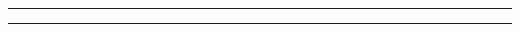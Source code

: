 \documentclass[a4paper,10pt]{report}
\begin{document}
\begin{multicols*}{3}


\vfill

\hrule\vspace{2mm}
\vspace{2mm}\hrule


\end{multicols*}
\end{document}
